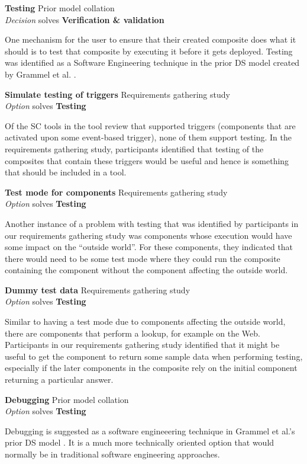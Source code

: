 \textbf{Testing} \hfill Prior model collation \cite{Grammel2010} \\ \emph{Decision} \hfill solves \textbf{Verification \& validation}

One mechanism for the user to ensure that their created composite does what it should is to test that composite by executing it before it gets deployed. Testing was identified as a Software Engineering technique in the prior DS model created by Grammel et al. \cite{Grammel2010}.

\textbf{Simulate testing of triggers} \hfill Requirements gathering study \\ \emph{Option} \hfill solves \textbf{Testing}

Of the SC tools in the tool review that supported triggers (components that are activated upon some event-based trigger), none of them support testing. In the requirements gathering study, participants identified that testing of the composites that contain these triggers would be useful and hence is something that should be included in a tool.

\textbf{Test mode for components} \hfill Requirements gathering study \\ \emph{Option} \hfill solves \textbf{Testing}

Another instance of a problem with testing that was identified by participants in our requirements gathering study was components whose execution would have some impact on the ``outside world''. For these components, they indicated that there would need to be some test mode where they could run the composite containing the component without the component affecting the outside world.

\textbf{Dummy test data} \hfill Requirements gathering study \\ \emph{Option} \hfill solves \textbf{Testing}

Similar to having a test mode due to components affecting the outside world, there are components that perform a lookup, for example on the Web. Participants in our requirements gathering study identified that it might be useful to get the component to return some sample data when performing testing, especially if the later components in the composite rely on the initial component returning a particular answer.

\textbf{Debugging} \hfill Prior model collation \cite{Grammel2010} \\ \emph{Option} \hfill solves \textbf{Testing}

Debugging is suggested as a software engineeering technique in Grammel et al.'s prior DS model \cite{Grammel2010}. It is a much more technically oriented option that would normally be in traditional software engineering approaches.

